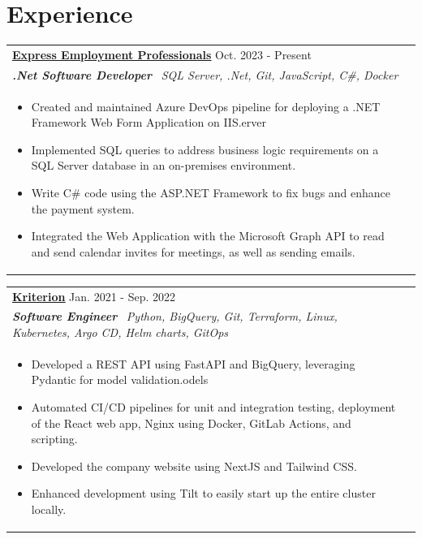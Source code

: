 \documentclass[a4paper,8pt]{article}
\begin{document}
\section{Experience}
\begin{tabularx}{\linewidth}{ @{}l r@{} }
\textbf{\uline{\href{https://expresspros.co.za}{Express Employment Professionals}}} \hfill \color[HTML]{371e77} Oct. 2023 - Present \\[4pt]
\color[HTML]{371e77}\textbf{\textit{.Net Software Developer}}\ \hfill \color[HTML]{4B28A4} \textit{SQL Server, .Net, Git, JavaScript, C\#, Docker } \\[5pt]
\begin{minipage}[t]{\linewidth}
    \begin{itemize}[nosep,after=\strut, leftmargin=2em, itemsep=2pt]
        \item Created and maintained Azure DevOps pipeline for deploying a .NET Framework Web Form Application on IIS.erver
        \item Implemented SQL queries to address business logic requirements on a SQL Server database in an on-premises environment.
        \item Write C\# code using the ASP.NET Framework to fix bugs and enhance the payment system.
        \item Integrated the Web Application with the Microsoft Graph API to read and send calendar invites for meetings, as well as sending emails.
    \end{itemize}
\end{minipage}
\end{tabularx}

\begin{tabularx}{\linewidth}{ @{}l r@{} }
\color[HTML]{1C033C} \textbf{\uline{\href{https://kriterion.ai}{Kriterion}}} \hfill \color[HTML]{371e77} Jan. 2021 - Sep. 2022 \\[4pt]
\color[HTML]{371e77}\textbf{\textit{Software Engineer}}\ \hfill \color[HTML]{4B28A4} \textit{Python, BigQuery, Git, Terraform, Linux, Kubernetes, Argo CD, Helm charts, GitOps} \\[5pt]
\begin{minipage}[t]{\linewidth}
    \begin{itemize}[nosep,after=\strut, leftmargin=2em, itemsep=2pt]
        \item Developed a REST API using FastAPI and BigQuery, leveraging Pydantic for model validation.odels
        \item Automated CI/CD pipelines for unit and integration testing, deployment of the React web app, Nginx using Docker, GitLab Actions, and scripting.
        \item Developed the company website using NextJS and Tailwind CSS.
        \item Enhanced development using Tilt to easily start up the entire cluster locally.
    \end{itemize}
\end{minipage}
\end{tabularx}
\end{document}
